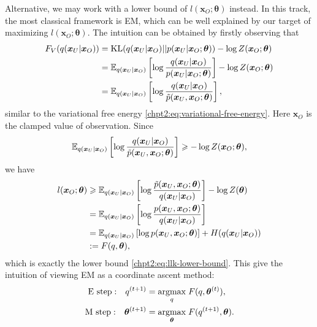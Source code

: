 Alternative, we may work with a lower bound of $l(\bm{x}_O; \bm{\theta})$ instead. In this track, the most classical framework is EM, which can be well explained by our target of maximizing $l(\bm{x}_O; \bm{\theta})$. The intuition can be obtained by firstly observing that
\begin{align}
  F_V(q(\bm{x}_U|\bm{x}_O)) & = \mathrm{KL}(q(\bm{x}_U|\bm{x}_O) || p(\bm{x}_U|\bm{x}_O; \bm{\theta})) - \log{Z(\bm{x}_O; \bm{\theta})} \nonumber \\
                            &= \mathbb{E}_{q(\bm{x}_U|\bm{x}_O)}\left[  \log{\frac{q(\bm{x}_U|\bm{x}_O)}{{p}(\bm{x}_U| \bm{x}_O; \bm{\theta})}} \right] - \log{Z(\bm{x}_O;\bm{\theta})} \nonumber \\
                            &= \mathbb{E}_{q(\bm{x}_U|\bm{x}_O)}\left[ \log{\frac{q(\bm{x}_U|\bm{x}_O)}{\tilde{p}(\bm{x}_U, \bm{x}_O; \bm{\theta})}} \right],
\end{align}
similar to the variational free energy \eqref{chpt2:eq:variational-free-energy}. Here $\bm{x}_O$ is the clamped value of observation. Since
\begin{equation}
  \mathbb{E}_{q(\bm{x}_U|\bm{x}_O)}\left[ \log{\frac{q(\bm{x}_U|\bm{x}_O)}{\tilde{p}(\bm{x}_U, \bm{x}_O; \bm{\theta})}} \right] \geqslant - \log{Z(\bm{x}_O; \bm{\theta})},
\end{equation}
we have
\begin{align}
  l(\bm{x}_O; \bm{\theta}) &\geqslant \mathbb{E}_{q(\bm{x}_U|\bm{x}_O)}\left[ \log{\frac{\tilde{p}(\bm{x}_U, \bm{x}_O; \bm{\theta})}{q(\bm{x}_U|\bm{x}_O)}} \right] - \log{Z(\bm{\theta})} \nonumber \\
                           & = \mathbb{E}_{q(\bm{x}_U|\bm{x}_O)}\left[ \log{\frac{{p}(\bm{x}_U, \bm{x}_O; \bm{\theta})}{q(\bm{x}_U|\bm{x}_O)}} \right] \nonumber \\
                           & = \mathbb{E}_{q(\bm{x}_U|\bm{x}_O)}\left[ \log{{p}(\bm{x}_U, \bm{x}_O; \bm{\theta})} \right] + H({q(\bm{x}_U|\bm{x}_O)}) \nonumber \\
                           & := F(q, \bm{\theta}),
\end{align}
which is exactly the lower bound \eqref{chpt2:eq:llk-lower-bound}. This give the intuition of viewing EM as a coordinate ascent method:
\begin{align}
  \mathrm{E~step:}~~~ q^{(t+1)} &= \underset{q}{\operatorname{argmax}}\;{F(q, \bm{\theta}^{(t)})}, \\
  \mathrm{M~step:}~~~\bm{\theta}^{(t+1)} &= \underset{\bm{\theta}}{\operatorname{argmax}}\;{F(q^{(t+1)}, \bm{\theta})}.
\end{align}

